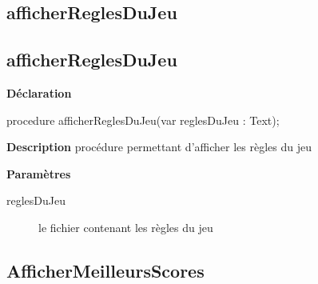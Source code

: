 \documentclass{report}
\newif\ifpdf
\begin{document}
\subsection*{\large{\textbf{afficherReglesDuJeu}}\normalsize\hspace{1ex}\hrulefill}
\else
\subsection*{afficherReglesDuJeu}
\fi
\label{Affichage-afficherReglesDuJeu}
\begin{list}{}{
\setlength{\itemindent}{0cm}
\setlength{\listparindent}{0cm}
\setlength{\leftmargin}{\evensidemargin}
\addtolength{\leftmargin}{\tmplength}
\settowidth{\labelsep}{X}
\addtolength{\leftmargin}{\labelsep}
\setlength{\labelwidth}{\tmplength}
}
\item[\textbf{Déclaration}\hfill]
\ifpdf
\begin{flushleft}
\fi
\begin{ttfamily}
procedure afficherReglesDuJeu(var reglesDuJeu : Text);\end{ttfamily}

\ifpdf
\end{flushleft}
\fi

\par
\item[\textbf{Description}]
procédure permettant d'afficher les règles du jeu \par
\item[\textbf{Paramètres}]
\begin{description}
\item[reglesDuJeu] le fichier contenant les règles du jeu
\end{description}


\end{list}
\ifpdf
\subsection*{\large{\textbf{AfficherMeilleursScores}}\normalsize\hspace{1ex}\hrulefill}
\else
\end{document}
